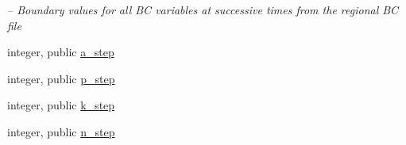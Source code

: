 \begin{DoxyCompactItemize}
\begin{DoxyCompactList}\small\item\em -- Boundary values for all B\-C variables at successive times from the regional B\-C file \end{DoxyCompactList}\item 
integer, public \hyperlink{classfv__regional__mod_a7d48ecf3376e882113cf29f2c50b996c}{a\-\_\-step}
\item 
integer, public \hyperlink{classfv__regional__mod_a829242ae29d3a80d8bf09dbc093cbac0}{p\-\_\-step}
\item 
integer, public \hyperlink{classfv__regional__mod_a4526a6a4dc765d8f17c9b291687bd316}{k\-\_\-step}
\item 
integer, public \hyperlink{classfv__regional__mod_afe2252139409c2841f1f01af51dd8fc3}{n\-\_\-step}
\end{DoxyCompactItemize}
